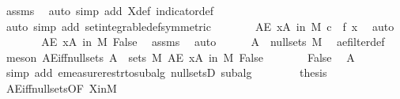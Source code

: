 \begin{isabellebody}
\ assms\ \isamarkupfalse%
\ {\isacharparenleft}{\kern0pt}auto\ simp\ add{\isacharcolon}{\kern0pt}\ X{\isacharunderscore}{\kern0pt}def\ indicator{\isacharunderscore}{\kern0pt}def{\isacharparenright}{\kern0pt}\isanewline
\ \ \ \ \isamarkupfalse%
\ {\isacharparenleft}{\kern0pt}auto\ simp\ add{\isacharcolon}{\kern0pt}\ set{\isacharunderscore}{\kern0pt}integrable{\isacharunderscore}{\kern0pt}def{\isacharbrackleft}{\kern0pt}symmetric{\isacharbrackright}{\kern0pt}{\isacharparenright}{\kern0pt}\isanewline
\ \ \ \ \isamarkupfalse%
\ \isamarkupfalse%
\ {\isachardoublequoteopen}AE\ x{\isasymin}A\ in\ M{\isachardot}{\kern0pt}\ c\ {\isacharequal}{\kern0pt}\ f\ x{\isachardoublequoteclose}\ \isamarkupfalse%
\ auto\isanewline
\ \ \ \ \isamarkupfalse%
\ \isamarkupfalse%
\ {\isachardoublequoteopen}AE\ x{\isasymin}A\ in\ M{\isachardot}{\kern0pt}\ False{\isachardoublequoteclose}\ \isamarkupfalse%
\ assms{\isacharparenleft}{\kern0pt}{}{\isacharparenright}{\kern0pt}\ \isamarkupfalse%
\ auto\isanewline
\ \ \ \ \isamarkupfalse%
\ {\isachardoublequoteopen}A\ {\isasymin}\ null{\isacharunderscore}{\kern0pt}sets\ M{\isachardoublequoteclose}\ \isamarkupfalse%
\ ae{\isacharunderscore}{\kern0pt}filter{\isacharunderscore}{\kern0pt}def\ \isamarkupfalse%
\ {\isacharparenleft}{\kern0pt}meson\ AE{\isacharunderscore}{\kern0pt}iff{\isacharunderscore}{\kern0pt}null{\isacharunderscore}{\kern0pt}sets\ {\isacartoucheopen}A\ {\isasymin}\ sets\ M{\isacartoucheclose}\ {\isacartoucheopen}AE\ x{\isasymin}A\ in\ M{\isachardot}{\kern0pt}\ False{\isacartoucheclose}{\isacharparenright}{\kern0pt}\isanewline
\ \ \ \ \isamarkupfalse%
\ \isamarkupfalse%
\ False\ \isamarkupfalse%
\ A{\isacharparenleft}{\kern0pt}{}{\isacharparenright}{\kern0pt}\isamarkupfalse%
\ {\isacharparenleft}{\kern0pt}simp\ add{\isacharcolon}{\kern0pt}\ emeasure{\isacharunderscore}{\kern0pt}restr{\isacharunderscore}{\kern0pt}to{\isacharunderscore}{\kern0pt}subalg\ null{\isacharunderscore}{\kern0pt}setsD{}\ subalg{\isacharparenright}{\kern0pt}\isanewline
\ \ \isamarkupfalse%
\isanewline
\ \ \isamarkupfalse%
\ \isamarkupfalse%
\ {\isacharquery}{\kern0pt}thesis\ \isamarkupfalse%
\ AE{\isacharunderscore}{\kern0pt}iff{\isacharunderscore}{\kern0pt}null{\isacharunderscore}{\kern0pt}sets{\isacharbrackleft}{\kern0pt}OF\ X{\isacharunderscore}{\kern0pt}in{\isacharunderscore}{\kern0pt}M{\isacharbrackright}{\kern0pt}\ \isamarkupfalse%

\end{isabellebody}
